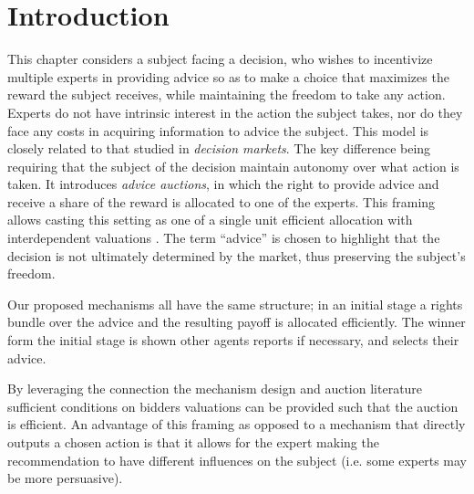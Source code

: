 
\section{Introduction}



This chapter considers a subject facing a decision, who wishes to incentivize multiple experts in providing advice so as to make a choice that maximizes the reward the subject receives, while maintaining the freedom to take any action.
Experts do not have intrinsic interest in the action the subject takes, nor do they face any costs in acquiring information to advice the subject.
This model is closely related to that studied in \emph{decision markets}. The key difference being requiring that the subject of the decision maintain autonomy over what action is taken. 
It introduces \emph{advice auctions}, in which the right to provide advice and receive a share of the reward is allocated to one of the experts. This framing allows casting this setting as one of a single unit efficient allocation with interdependent valuations \citep{milgrom1982theory,maskin1992auctions,ausubel1999generalized,mclean2004informational,roughgarden2016optimal,eden2018interdependent}.
The term ``advice'' is chosen to highlight that the decision is not ultimately determined by the market, thus preserving the subject's freedom.

Our proposed mechanisms all have the same structure; in an initial stage a rights bundle over the advice and the resulting payoff is allocated efficiently. The winner form the initial stage is shown other agents reports if necessary, and selects their advice.

By leveraging the connection the mechanism design and auction literature sufficient conditions on bidders valuations can be provided such that the auction is efficient. 
An advantage of this framing as opposed to a mechanism that directly outputs a chosen action is that it allows for the expert making the recommendation to have different influences on the subject (i.e. some experts may be more persuasive).


